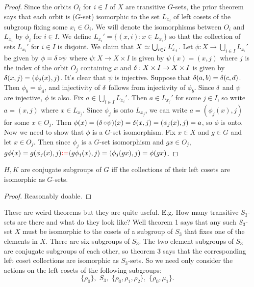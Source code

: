 \begin{proof}
Since the orbits $O_i$ for $i \in I$ of $X$ are transitive $G$-sets,
the prior theorem says that each orbit
is ($G$-set) isomorphic to
the set $L_{x_i}$ of left cosets of the subgroup fixing some $x_i \in O_i$.
We will denote the isomorphisms between $O_i$ and $L_{x_i}$ by $\phi_i$ for $i \in I$.
We define $L_{x_i}' = \{(x,i): x \in L_{x_i}\}$ so that the
collection of sets $L_{x_i}'$ for $i \in I$ is disjoint.
We claim that $X \operatorname{\,\simeq\,} \bigcup_{i \in I} L_{x_i}'$.
Let $\phi: X \to \bigcup_{i \in I} L_{x_i}'$ be given by $\phi =
\operatorname{\delta} \circ \psi$ where $\psi: X \to X \times I$ is given by $\psi(x) = (x,j)$ where $j$ is the index of the orbit $O_j$ containing $x$ and $\operatorname{\delta}: X \times I \to X \times I$ is given by $\operatorname{\delta}(x,j) = (\phi_j(x),j)$.
It's clear that $\psi$ is injective. Suppose that $\operatorname{\delta}(a,b) = \operatorname{\delta}(c,d)$. Then $\phi_b = \phi_d$, and injectivity of $\operatorname{\delta}$ follows from injectivity of $\phi_b$.
Since $\operatorname{\delta}$ and $\psi$
are injective, $\phi$ is also. Fix $a \in \bigcup_{i \in I} L_{x_i}'$. Then $a \in L_{x_j}'$ for some $j \in I$, so write $a = (x,j)$ where $x \in L_{x_j}$. Since $\phi_j$ is onto $L_{x_j}$,
we can write $a = (\phi_j(x),j)$ for some $x \in O_j$. Then $\phi(x) = (\operatorname{\delta} \circ \psi) (x) = \operatorname{\delta}(x,j) = (\phi_j(x),j) = a$, so $\phi$ is onto.
Now we need to show that $\phi$ is a $G$-set isomorphism. Fix $x \in X$ and $g \in G$ and let $x \in O_j$.
Then since $\phi_j$ is a $G$-set isomorphism and $gx \in O_j$,
$g \phi(x) = g(\phi_j(x),j) \textcolor{red}{\vcentcolon=} (g \phi_j(x),j) = (\phi_j(gx),j) = \phi(gx)$.
\end{proof}
\begin{theorem}
$H,K$ are conjugate subgroups of $G$ iff the collections of their
left cosets are isomorphic as $G$-sets.
\end{theorem}
\begin{proof}
Reasonably doable.
\end{proof}
\noindent These are weird theorems but they are quite useful.
E.g. How many transitive $S_3$-sets are there and what do they look like? Well theorem 1 says
that any such $S_3$-set $X$ must be isomorphic
to the cosets of a subgroup of $S_3$ that fixes one of the elements in $X$.
There are six subgroups of $S_3$. The two element subgroups of $S_3$ are conjugate subgroups of each other, so
theorem 3 says that the corresponding left coset collections are isomorphic as $S_3$-sets. So we need only consider the actions on the left cosets of the following subgroups: $$
\{\rho_0\}, \,\, S_3, \,\, \{\rho_0,\rho_1,\rho_2\}, \,\, \{ \rho_0, \mu_1\}.
$$
